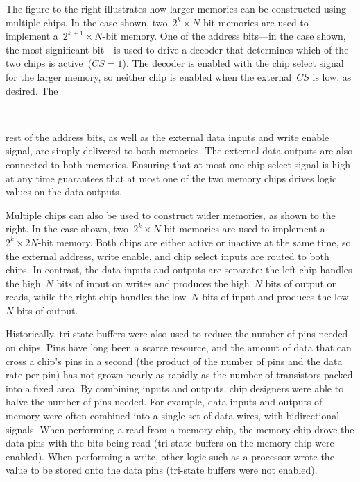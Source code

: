 \begin{minipage}{1.5in}
The figure to the right illustrates how larger memories can be constructed
using multiple chips.  In the case shown, two~\mbox{$2^{k}\times{N}$-bit} 
memories are used to implement a~\mbox{$2^{k+1}\times{N}$-bit} memory.
One of the address bits---in the case shown, the most significant bit---is
used to drive a decoder that determines which of the two chips is 
active~($CS=1$).  The decoder is enabled with the chip select signal for
the larger memory, so neither chip is enabled when the external~$CS$ is
low, as desired.  The\linebreak
\end{minipage}\hspace{0.25in}%
\begin{minipage}{4.75in}
\\
\end{minipage}\mpdone

rest of the address bits, as well as the external
data inputs and write enable signal, are simply delivered to both memories.
The external data outputs are also connected to both memories.  
Ensuring that at most one chip select signal is high at any time
guarantees that at most one of the two memory chips drives logic values
on the data outputs.

\begin{minipage}{2.2in}
Multiple chips can also be used to construct wider memories, as shown to
the right.  In the case shown, two~\mbox{$2^{k}\times{N}$-bit} 
memories are used to implement a~\mbox{$2^{k}\times{2N}$-bit} memory.
Both chips are either active or inactive at the same time, so the external 
address, write enable, and chip select inputs are routed to both chips.
In contrast, the data inputs and outputs are separate: the left chip
handles the high~$N$ bits of input on writes and produces the high~$N$
bits of output on reads, while the right chip handles the low~$N$ bits of 
input and produces the low~$N$ bits of output.
\end{minipage}\hspace{0.25in}%
\begin{minipage}{4.75in}
\end{minipage}

Historically, tri-state buffers were also used to reduce the number of
pins needed on chips.  Pins have long been a scarce resource, and the 
amount of data that can cross a chip's pins in a second (the product of the
number of pins and the data rate per pin) has not grown nearly as rapidly 
as the number of transistors packed into a fixed area.
%
By combining inputs and outputs, chip designers were able to halve the
number of pins needed.  For example, data inputs and outputs of memory
were often combined into a single set of data wires, with bidirectional
signals.  When performing a read from a memory chip, the memory chip
drove the data pins with the bits being read (tri-state buffers on the
memory chip were enabled).  When performing a write, other logic such as 
a processor wrote the value to be stored onto the data pins (tri-state 
buffers were not enabled).\\


